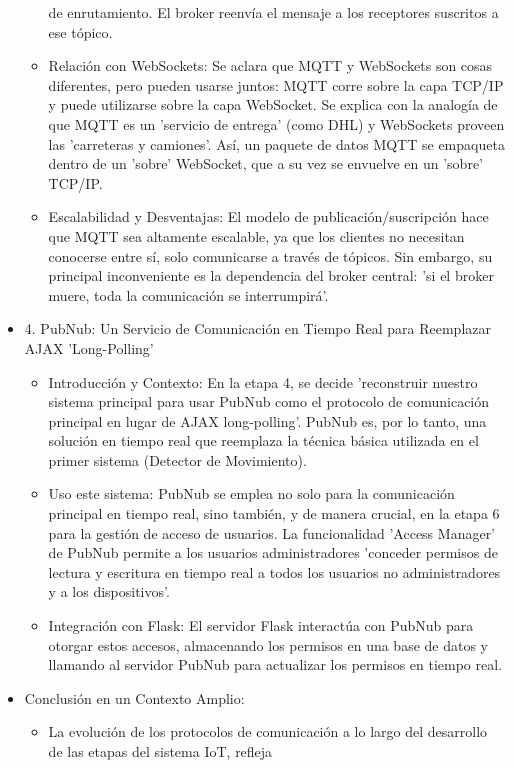 \documentclass{report}
\begin{document}
\begin{itemize}
\begin{itemize}
        de enrutamiento. El broker reenvía el mensaje a los receptores suscritos a ese tópico.
        \item Relación con WebSockets: Se aclara que MQTT y WebSockets son cosas diferentes, pero pueden usarse juntos: MQTT corre sobre 
        la capa TCP/IP y puede utilizarse sobre la capa WebSocket. Se explica con la analogía de que MQTT es un 'servicio de entrega' 
        (como DHL) y WebSockets proveen las 'carreteras y camiones'. Así, un paquete de datos MQTT se empaqueta dentro de un 'sobre' 
        WebSocket, que a su vez se envuelve en un 'sobre' TCP/IP.
        \item Escalabilidad y Desventajas: El modelo de publicación/suscripción hace que MQTT sea altamente escalable, ya que los 
        clientes no necesitan conocerse entre sí, solo comunicarse a través de tópicos. Sin embargo, su principal inconveniente es la 
        dependencia del broker central: 'si el broker muere, toda la comunicación se interrumpirá'.
    \end{itemize}
    \item 4. PubNub: Un Servicio de Comunicación en Tiempo Real para Reemplazar AJAX 'Long-Polling'
    \begin{itemize}
        \item Introducción y Contexto: En la etapa 4, se decide 'reconstruir nuestro sistema principal para usar PubNub como el 
        protocolo de comunicación principal en lugar de AJAX long-polling'. PubNub es, por lo tanto, una solución en tiempo real 
        que reemplaza la técnica básica utilizada en el primer sistema (Detector de Movimiento).
        \item Uso este sistema: PubNub se emplea no solo para la comunicación principal en tiempo real, sino también, y de manera 
        crucial, en la etapa 6 para la gestión de acceso de usuarios. La funcionalidad 'Access Manager' de PubNub permite a los usuarios 
        administradores 'conceder permisos de lectura y escritura en tiempo real a todos los usuarios no administradores y a los dispositivos'.
        \item Integración con Flask: El servidor Flask interactúa con PubNub para otorgar estos accesos, almacenando los permisos en 
        una base de datos y llamando al servidor PubNub para actualizar los permisos en tiempo real.
    \end{itemize}
    \item Conclusión en un Contexto Amplio:
    \begin{itemize}
        \item La evolución de los protocolos de comunicación a lo largo del desarrollo de las etapas del sistema IoT, refleja 

\end{itemize}
\end{itemize}
\end{document}
